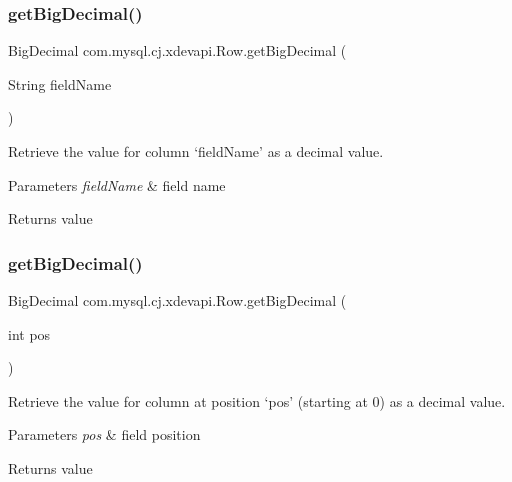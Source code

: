 \subsubsection{\texorpdfstring{get\+Big\+Decimal()}{getBigDecimal()}\hspace{0.1cm}{\footnotesize\ttfamily [1/2]}}
{\footnotesize\ttfamily Big\+Decimal com.\+mysql.\+cj.\+xdevapi.\+Row.\+get\+Big\+Decimal (\begin{DoxyParamCaption}\item[{String}]{field\+Name }\end{DoxyParamCaption})}

Retrieve the value for column `field\+Name' as a decimal value.


\begin{DoxyParams}{Parameters}
{\em field\+Name} & field name \\
\hline
\end{DoxyParams}
\begin{DoxyReturn}{Returns}
value 
\end{DoxyReturn}
\mbox{\label{interfacecom_1_1mysql_1_1cj_1_1xdevapi_1_1_row_ad42dea464dbed995ab6462661de3a794}} 
\subsubsection{\texorpdfstring{get\+Big\+Decimal()}{getBigDecimal()}\hspace{0.1cm}{\footnotesize\ttfamily [2/2]}}
{\footnotesize\ttfamily Big\+Decimal com.\+mysql.\+cj.\+xdevapi.\+Row.\+get\+Big\+Decimal (\begin{DoxyParamCaption}\item[{int}]{pos }\end{DoxyParamCaption})}

Retrieve the value for column at position `pos' (starting at 0) as a decimal value.


\begin{DoxyParams}{Parameters}
{\em pos} & field position \\
\hline
\end{DoxyParams}
\begin{DoxyReturn}{Returns}
value 
\end{DoxyReturn}
\mbox{\label{interfacecom_1_1mysql_1_1cj_1_1xdevapi_1_1_row_a9f2cb54221ed0600ce68e1f4638cce26}} 
